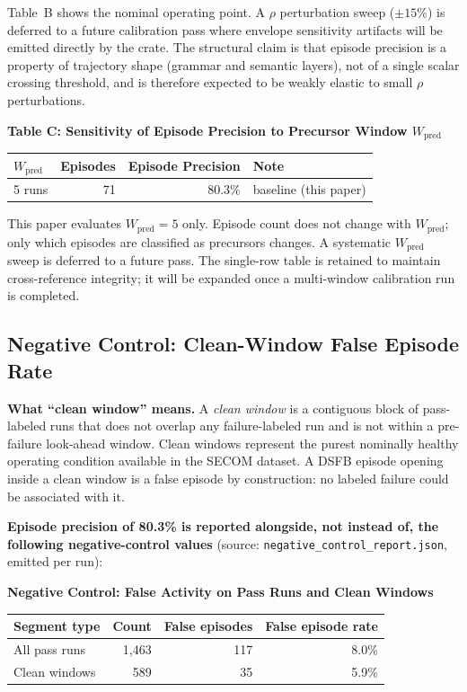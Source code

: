 \documentclass[11pt,letterpaper]{article}
\theoremstyle{scresult}
\begin{document}
\noindent Table~B shows the nominal operating point. A $\rho$ perturbation sweep ($\pm15\%$)
is deferred to a future calibration pass where envelope sensitivity artifacts will be
emitted directly by the crate. The structural claim is that episode precision is a
property of trajectory shape (grammar and semantic layers), not of a single scalar
crossing threshold, and is therefore expected to be weakly elastic to small $\rho$
perturbations.

\begin{center}
\small
\textbf{Table C: Sensitivity of Episode Precision to Precursor Window $W_{\text{pred}}$}\\ [4pt]
\begin{tabular}{lrrl}
\toprule
$W_{\text{pred}}$ & Episodes & Episode Precision & Note \\
\midrule
5 runs  & 71 & 80.3\%  & baseline (this paper) \\
\bottomrule
\end{tabular}
\end{center}
\noindent This paper evaluates $W_{\text{pred}} = 5$ only. Episode count does
not change with $W_{\text{pred}}$; only which episodes are classified as
precursors changes. A systematic $W_{\text{pred}}$ sweep is deferred to a
future pass. The single-row table is retained to maintain cross-reference
integrity; it will be expanded once a multi-window calibration run is
completed.

\subsection{Negative Control: Clean-Window False Episode Rate}
\label{sec:negative-control}

\textbf{What ``clean window'' means.}
A \emph{clean window} is a contiguous block of pass-labeled runs that does
not overlap any failure-labeled run and is not within a pre-failure look-ahead
window. Clean windows represent the purest nominally healthy operating condition
available in the SECOM dataset. A DSFB episode opening inside a clean window
is a false episode by construction: no labeled failure could be associated with
it.

\textbf{Episode precision of 80.3\% is reported alongside, not instead of,
the following negative-control values} (source:
\texttt{negative\_control\_report.json}, emitted per run):

\begin{center}
\small
\textbf{Negative Control: False Activity on Pass Runs and Clean Windows}\\[4pt]
\begin{tabular}{lrrr}
\toprule
\textbf{Segment type} & \textbf{Count} & \textbf{False episodes} & \textbf{False episode rate}\\
\midrule
All pass runs     & 1{,}463 & 117 & 8.0\% \\
Clean windows     &   589   &  35 & 5.9\% \\
\bottomrule
\end{tabular}
\end{center}
\end{document}
